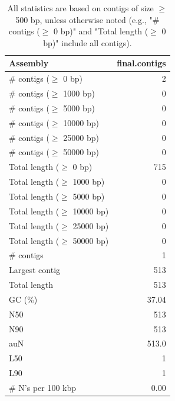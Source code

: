 \documentclass[12pt,a4paper]{article}
\begin{document}
\begin{table}[ht]
\begin{center}
\caption{All statistics are based on contigs of size $\geq$ 500 bp, unless otherwise noted (e.g., "\# contigs ($\geq$ 0 bp)" and "Total length ($\geq$ 0 bp)" include all contigs).}
\begin{tabular}{|l*{1}{|r}|}
\hline
Assembly & final.contigs \\ \hline
\# contigs ($\geq$ 0 bp) & 2 \\ \hline
\# contigs ($\geq$ 1000 bp) & 0 \\ \hline
\# contigs ($\geq$ 5000 bp) & 0 \\ \hline
\# contigs ($\geq$ 10000 bp) & 0 \\ \hline
\# contigs ($\geq$ 25000 bp) & 0 \\ \hline
\# contigs ($\geq$ 50000 bp) & 0 \\ \hline
Total length ($\geq$ 0 bp) & 715 \\ \hline
Total length ($\geq$ 1000 bp) & 0 \\ \hline
Total length ($\geq$ 5000 bp) & 0 \\ \hline
Total length ($\geq$ 10000 bp) & 0 \\ \hline
Total length ($\geq$ 25000 bp) & 0 \\ \hline
Total length ($\geq$ 50000 bp) & 0 \\ \hline
\# contigs & 1 \\ \hline
Largest contig & 513 \\ \hline
Total length & 513 \\ \hline
GC (\%) & 37.04 \\ \hline
N50 & 513 \\ \hline
N90 & 513 \\ \hline
auN & 513.0 \\ \hline
L50 & 1 \\ \hline
L90 & 1 \\ \hline
\# N's per 100 kbp & 0.00 \\ \hline
\end{tabular}
\end{center}
\end{table}
\end{document}
